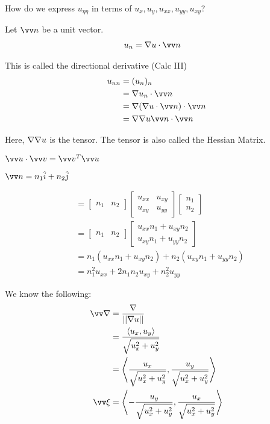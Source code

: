 \documentclass{article}
\begin{document}
How do we express $u_{\eta\eta}$ in terms of $u_x, u_y, u_{xx}, u_{yy}, u_{xy}$?

Let $\vv n$ be a unit vector.
%
\begin{align}
  u_n & = \grad u \cdot \vv n
\end{align}

This is called the directional derivative (Calc III)
%
\begin{align}
  u_{nn}
  & = (u_n)_n\\
  & = \grad u_n \cdot \vv n\\
  & = \grad(\grad u \cdot \vv n) \cdot \vv n\\
  & = \grad \grad u \vv n \cdot \vv n
\end{align}

Here, $\nabla \nabla u$ is the tensor. The tensor is also called the Hessian Matrix.

$\vv u \cdot \vv v = \vv v^T \vv u$

$\vv n = n_1 \hat i + n_2 \hat j$

%
\begin{align}
  & =
  \begin{bmatrix}
    n_1 & n_2
  \end{bmatrix}
  \begin{bmatrix}
    u_{xx} & u_{xy}\\
    u_{xy} & u_{yy}
  \end{bmatrix}
  \begin{bmatrix}
    n_1\\
    n_2
  \end{bmatrix}\\
  & =
  \begin{bmatrix}
    n_1 & n_2
  \end{bmatrix}
  \begin{bmatrix}
    u_{xx}n_1 + u_{xy} n_2\\
    u_{xy}n_1 + u_{yy} n_2
  \end{bmatrix}\\
  & =
    n_1 (u_{xx}n_1 + u_{xy} n_2) +
    n_2 (u_{xy}n_1 + u_{yy} n_2)\\
  & =
    n^2_1 u_{xx} + 2n_1 n_2 u_{xy} + n^2_2 u_{yy}
\end{align}

We know the following:
%
\begin{align}
  \vv \nabla
  & = \frac{\grad}{||\grad u||}\\
  & = \frac{\left<u_x, u_y\right>}{\sqrt{u^2_x + u^2_y}}\\
  & = \left<  \frac{u_x}{\sqrt{u^2_x + u^2_y}} , \frac{u_y}{\sqrt{u^2_x + u^2_y}} \right>\\
  \vv \xi & = \left<- \frac{u_y}{\sqrt{u^2_x + u^2_y}} , \frac{u_x}{\sqrt{u^2_x + u^2_y}} \right>
\end{align}
\end{document}
